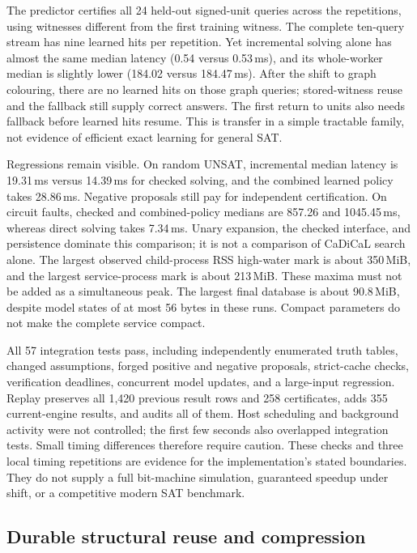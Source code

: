 \documentclass[11pt,a4paper]{article}
\numberwithin{equation}{section}
\theoremstyle{plain}
\theoremstyle{definition}
\theoremstyle{remark}
\begin{document}
The predictor certifies all 24 held-out signed-unit queries across the repetitions, using witnesses different from the first training witness. The complete ten-query stream has nine learned hits per repetition. Yet incremental solving alone has almost the same median latency (0.54 versus 0.53\,ms), and its whole-worker median is slightly lower (184.02 versus 184.47\,ms). After the shift to graph colouring, there are no learned hits on those graph queries; stored-witness reuse and the fallback still supply correct answers. The first return to units also needs fallback before learned hits resume. This is transfer in a simple tractable family, not evidence of efficient exact learning for general SAT.

Regressions remain visible. On random UNSAT, incremental median latency is 19.31\,ms versus 14.39\,ms for checked solving, and the combined learned policy takes 28.86\,ms. Negative proposals still pay for independent certification. On circuit faults, checked and combined-policy medians are 857.26 and 1045.45\,ms, whereas direct solving takes 7.34\,ms. Unary expansion, the checked interface, and persistence dominate this comparison; it is not a comparison of CaDiCaL search alone. The largest observed child-process RSS high-water mark is about 350\,MiB, and the largest service-process mark is about 213\,MiB. These maxima must not be added as a simultaneous peak. The largest final database is about 90.8\,MiB, despite model states of at most 56 bytes in these runs. Compact parameters do not make the complete service compact.

All 57 integration tests pass, including independently enumerated truth tables, changed assumptions, forged positive and negative proposals, strict-cache checks, verification deadlines, concurrent model updates, and a large-input regression. Replay preserves all 1,420 previous result rows and 258 certificates, adds 355 current-engine results, and audits all of them. Host scheduling and background activity were not controlled; the first few seconds also overlapped integration tests. Small timing differences therefore require caution. These checks and three local timing repetitions are evidence for the implementation's stated boundaries. They do not supply a full bit-machine simulation, guaranteed speedup under shift, or a competitive modern SAT benchmark.


\subsection{Durable structural reuse and compression}
\label{sec:structural-service}
\end{document}
